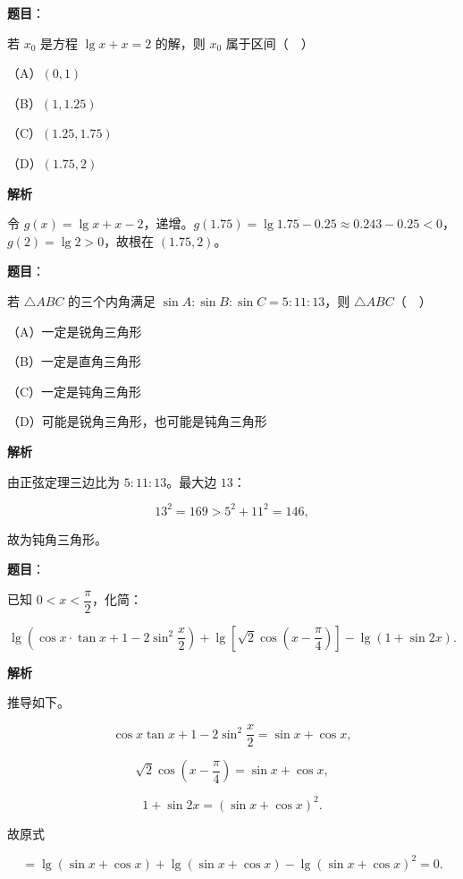 \begin{answer}

\textbf{题目}：

若 $x_0$ 是方程 $\lg x+x=2$ 的解，则 $x_0$ 属于区间（　）

（A）$(0,1)$

（B）$(1,1.25)$

（C）$(1.25,1.75)$

（D）$(1.75,2)$

\textbf{解析}

令 $g(x)=\lg x+x-2$，递增。$g(1.75)=\lg1.75-0.25\approx0.243-0.25<0$，$g(2)=\lg2>0$，故根在 $(1.75,2)$。


\end{answer}
\begin{answer}

\textbf{题目}：

若 $\triangle ABC$ 的三个内角满足 $\sin A:\sin B:\sin C=5:11:13$，则 $\triangle ABC$（　）

（A）一定是锐角三角形

（B）一定是直角三角形

（C）一定是钝角三角形

（D）可能是锐角三角形，也可能是钝角三角形

\textbf{解析}

由正弦定理三边比为 $5:11:13$。最大边 $13$：

\nopagebreak[4]
\[13^2=169>5^2+11^2=146,\]

故为钝角三角形。


\end{answer}
\begin{answer}

\textbf{题目}：

已知 $0<x<\dfrac\pi2$，化简：

\nopagebreak[4]
\[\lg\left(\cos x\cdot\tan x+1-2\sin^2\frac x2\right)
+\lg\left[\sqrt2\cos\left(x-\frac\pi4\right)\right]
-\lg(1+\sin2x).\]

\textbf{解析}

推导如下。

\nopagebreak[4]
\[\cos x\tan x+1-2\sin^2\frac x2
=\sin x+\cos x,\]

\nopagebreak[4]
\[\sqrt2\cos\left(x-\frac\pi4\right)=\sin x+\cos x,\]

\nopagebreak[4]
\[1+\sin2x=(\sin x+\cos x)^2.\]

故原式

\nopagebreak[4]
\[=\lg(\sin x+\cos x)+\lg(\sin x+\cos x)-\lg(\sin x+\cos x)^2=0.\]


\end{answer}
